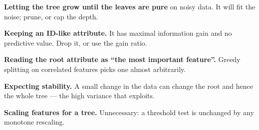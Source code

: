 \begin{pitfall}
\begin{tight}
  \item \textbf{Letting the tree grow until the leaves are pure} on noisy data. It
        will fit the noise; prune, or cap the depth.
  \item \textbf{Keeping an ID-like attribute.} It has maximal information gain and
        no predictive value. Drop it, or use the gain ratio.
  \item \textbf{Reading the root attribute as ``the most important feature''.}
        Greedy splitting on correlated features picks one almost arbitrarily.
  \item \textbf{Expecting stability.} A small change in the data can change the
        root and hence the whole tree --- the high variance that
         exploits.
  \item \textbf{Scaling features for a tree.} Unnecessary: a threshold test is
        unchanged by any monotone rescaling.
\end{tight}
\end{pitfall}

